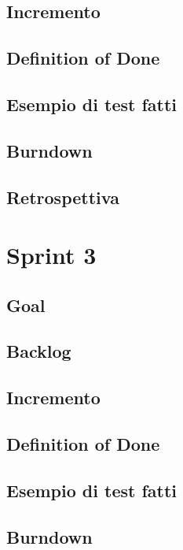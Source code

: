 \documentclass{article}
\begin{document}
\subsection{Incremento}

\subsection{Definition of Done}

\subsection{Esempio di test fatti}

\subsection{Burndown}

\subsection{Retrospettiva}

\section{Sprint 3}

\subsection{Goal}

\subsection{Backlog}

\subsection{Incremento}

\subsection{Definition of Done}

\subsection{Esempio di test fatti}

\subsection{Burndown}
\end{document}

